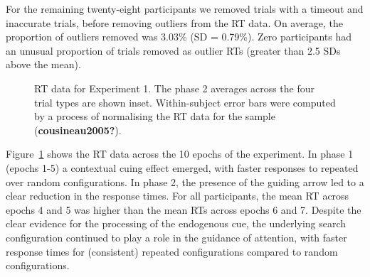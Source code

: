 \documentclass[
  man,
  floatsintext,
  longtable,
  nolmodern,
  notxfonts,
  notimes,
  colorlinks=true,linkcolor=blue,citecolor=blue,urlcolor=blue]{apa7}
\begin{document}
For the remaining twenty-eight participants we removed trials with a
timeout and inaccurate trials, before removing outliers from the RT
data. On average, the proportion of outliers removed was 3.03\% (SD =
0.79\%). Zero participants had an unusual proportion of trials removed
as outlier RTs (greater than 2.5 SDs above the mean).

\begin{figure}[H]


\caption{\label{fig-RT-exp1}RT data for Experiment 1. The phase 2
averages across the four trial types are shown inset. Within-subject
error bars were computed by a process of normalising the RT data for the
sample (\textbf{cousineau2005?}).}

\end{figure}%

Figure~\ref{fig-RT-exp1} shows the RT data across the 10 epochs of the
experiment. In phase 1 (epochs 1-5) a contextual cuing effect emerged,
with faster responses to repeated over random configurations. In phase
2, the presence of the guiding arrow led to a clear reduction in the
response times. For all participants, the mean RT across epochs 4 and 5
was higher than the mean RTs across epochs 6 and 7. Despite the clear
evidence for the processing of the endogenous cue, the underlying search
configuration continued to play a role in the guidance of attention,
with faster response times for (consistent) repeated configurations
compared to random configurations.
\end{document}
